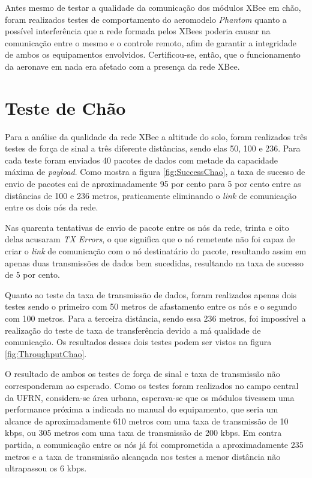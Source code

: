 \label{Cap:Resultados}

Antes mesmo de testar a qualidade da comunicação dos módulos XBee em chão, foram realizados testes de comportamento do aeromodelo \emph{Phantom} quanto a possível interferência que a rede formada pelos XBees poderia causar na comunicação entre o mesmo e o controle remoto, afim de garantir a integridade de ambos os equipamentos envolvidos. Certificou-se, então, que o funcionamento da aeronave em nada era afetado com a presença da rede XBee.

\section{Teste de Chão}

Para a análise da qualidade da rede XBee a altitude do solo, foram realizados três testes de força de sinal a três diferente distâncias, sendo elas 50, 100 e 236. Para cada teste foram enviados 40 pacotes de dados com metade da capacidade máxima de \emph{payload}. Como mostra a figura \ref{fig:SuccessChao}, a taxa de sucesso de envio de pacotes cai de aproximadamente 95 por cento para 5 por cento entre as distâncias de 100 e 236 metros, praticamente eliminando o \emph{link} de comunicação entre os dois nós da rede.

Nas quarenta tentativas de envio de pacote entre os nós da rede, trinta e oito delas acusaram \emph{TX Errors}, o que significa que o nó remetente não foi capaz de criar o \emph{link} de comunicação com o nó destinatário do pacote, resultando assim em apenas duas transmissões de dados bem sucedidas, resultando na taxa de sucesso de 5 por cento.

Quanto ao teste da taxa de transmissão de dados, foram realizados apenas dois testes sendo o primeiro com 50 metros de afastamento entre os nós e o segundo com 100 metros. Para a terceira distância, sendo essa 236 metros, foi impossível a realização do teste de taxa de transferência devido a má qualidade de comunicação. Os resultados desses dois testes podem ser vistos na figura \ref{fig:ThroughputChao}.

O resultado de ambos os testes de força de sinal e taxa de transmissão não corresponderam ao esperado. Como os testes foram realizados no campo central da UFRN, considera-se área urbana, esperava-se que os módulos tivessem uma performance próxima a indicada no manual do equipamento, que seria um alcance de aproximadamente 610 metros com uma taxa de transmissão de 10 kbps, ou 305 metros com uma taxa de transmissão de 200 kbps. Em contra partida, a comunicação entre os nós já foi comprometida a aproximadamente 235 metros e a taxa de transmissão alcançada nos testes a menor distância não ultrapassou os 6 kbps. 

